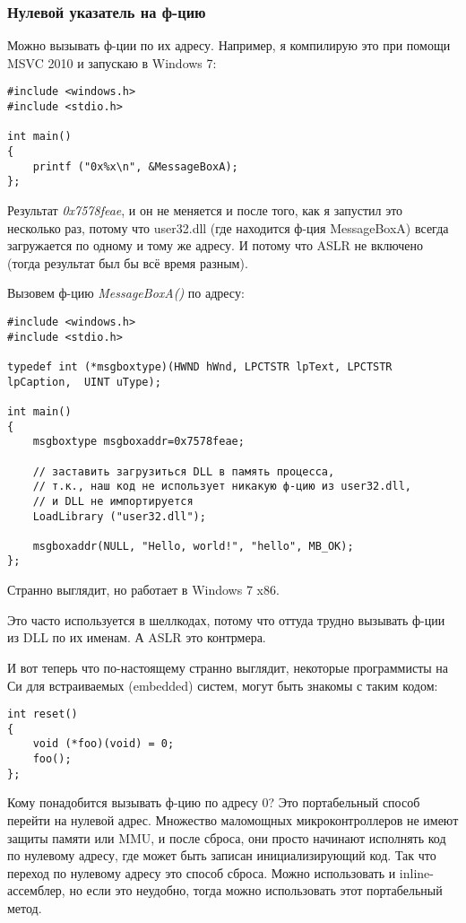 \subsubsection{Нулевой указатель на ф-цию}

Можно вызывать ф-ции по их адресу.
Например, я компилирую это при помощи MSVC 2010 и запускаю в Windows 7:

\begin{lstlisting}[style=customc]
#include <windows.h>
#include <stdio.h>

int main()
{
	printf ("0x%x\n", &MessageBoxA);
};
\end{lstlisting}

Результат \emph{0x7578feae}, и он не меняется и после того, как я запустил это несколько раз, потому что
user32.dll (где находится ф-ция MessageBoxA) всегда загружается по одному и тому же адресу.
И потому что \ac{ASLR} не включено (тогда результат был бы всё время разным).

Вызовем ф-цию \emph{MessageBoxA()} по адресу:

\begin{lstlisting}[style=customc]
#include <windows.h>
#include <stdio.h>

typedef int (*msgboxtype)(HWND hWnd, LPCTSTR lpText, LPCTSTR lpCaption,  UINT uType);

int main()
{
	msgboxtype msgboxaddr=0x7578feae;

	// заставить загрузиться DLL в память процесса,
	// т.к., наш код не использует никакую ф-цию из user32.dll, 
	// и DLL не импортируется
	LoadLibrary ("user32.dll");

	msgboxaddr(NULL, "Hello, world!", "hello", MB_OK);
};
\end{lstlisting}

Странно выглядит, но работает в Windows 7 x86.

Это часто используется в шеллкодах, потому что оттуда трудно вызывать ф-ции из DLL по их именам.
А \ac{ASLR} это контрмера.

И вот теперь что по-настоящему странно выглядит, некоторые программисты на Си для встраиваемых (embedded) систем, могут быть
знакомы с таким кодом:

\begin{lstlisting}[style=customc]
int reset()
{
	void (*foo)(void) = 0;
	foo();
};
\end{lstlisting}

Кому понадобится вызывать ф-цию по адресу 0?
Это портабельный способ перейти на нулевой адрес.
Множество маломощных микроконтроллеров не имеют защиты памяти или \ac{MMU}, и после сброса, они просто начинают
исполнять код по нулевому адресу, где может быть записан инициализирующий код.
Так что переход по нулевому адресу это способ сброса.
Можно использовать и inline-ассемблер, но если это неудобно, тогда можно использовать этот портабельный метод.

